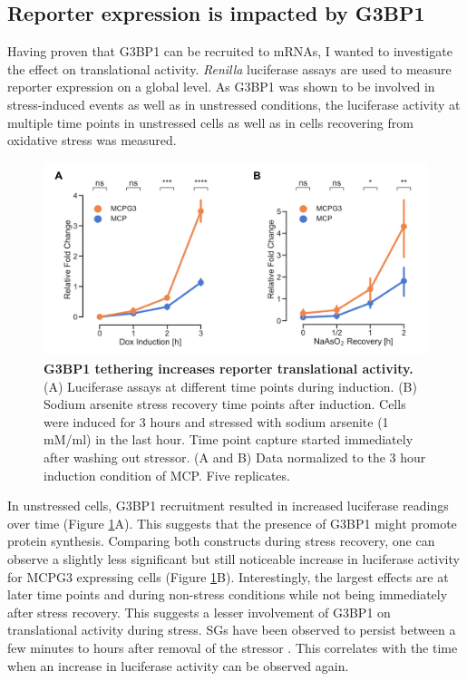 \subsection{Reporter expression is impacted by G3BP1} \label{mcp_luciferase}

Having proven that G3BP1 can be recruited to mRNAs, I wanted to investigate the effect on translational activity. \textit{Renilla} luciferase assays are used to measure reporter expression on a global level.
As G3BP1 was shown to be involved in stress-induced events as well as in unstressed conditions, the luciferase activity at multiple time points in unstressed cells as well as in cells recovering from oxidative stress was measured.

\begin{figure}[t!]
    \centering
    \includegraphics[width=\linewidth]{images/figure3}
    \caption{\textbf{G3BP1 tethering increases reporter translational activity.}
        (A) Luciferase assays at different time points during induction.
        (B) Sodium arsenite stress recovery time points after induction.
            Cells were induced for 3 hours and stressed with sodium arsenite (1 mM/ml) in the last hour.
            Time point capture started immediately after washing out stressor.
        (A and B) Data normalized to the 3 hour induction condition of MCP. Five replicates.   
    }
    \label{fig:mcp_luciferase}
\end{figure}

In unstressed cells, G3BP1 recruitment resulted in increased luciferase readings over time (Figure \ref{fig:mcp_luciferase}A).
This suggests that the presence of G3BP1 might promote protein synthesis.
Comparing both constructs during stress recovery, one can observe a slightly less significant but still noticeable increase in luciferase activity for MCPG3 expressing cells (Figure \ref{fig:mcp_luciferase}B).
Interestingly, the largest effects are at later time points and during non-stress conditions while not being immediately after stress recovery.
This suggests a lesser involvement of G3BP1 on translational activity during stress.
SGs have been observed to persist between a few minutes to hours after removal of the stressor \cite{chen_relationships_2017}.
This correlates with the time when an increase in luciferase activity can be observed again.


